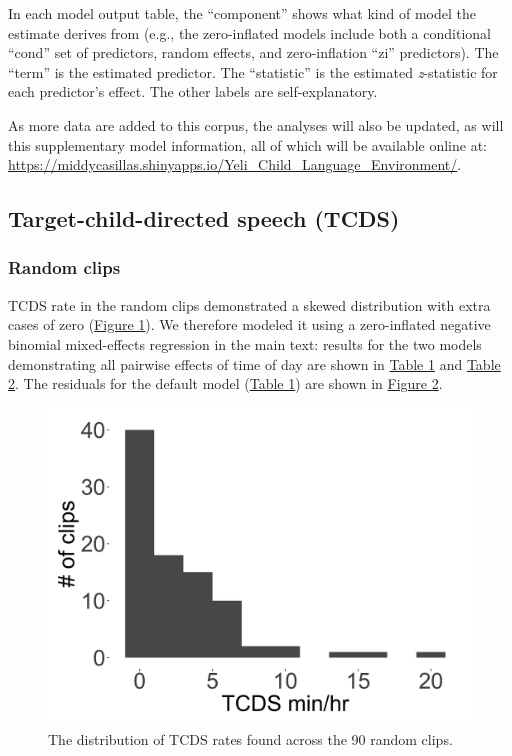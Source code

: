\documentclass[,man,floatsintext]{apa6}
\begin{document}
In each model output table, the \enquote{component} shows what kind of
model the estimate derives from (e.g., the zero-inflated models include
both a conditional \enquote{cond} set of predictors, random effects, and
zero-inflation \enquote{zi} predictors). The \enquote{term} is the
estimated predictor. The \enquote{statistic} is the estimated
\emph{z}-statistic for each predictor's effect. The other labels are
self-explanatory.

As more data are added to this corpus, the analyses will also be
updated, as will this supplementary model information, all of which will
be available online at:
\url{https://middycasillas.shinyapps.io/Yeli_Child_Language_Environment/}.

\subsection{Target-child-directed speech (TCDS)}\label{models-tcds}

\subsubsection{Random clips}\label{models-tcds-random}

TCDS rate in the random clips demonstrated a skewed distribution with
extra cases of zero (\protect\hyperlink{fig1}{Figure 1}). We therefore
modeled it using a zero-inflated negative binomial mixed-effects
regression in the main text: results for the two models demonstrating
all pairwise effects of time of day are shown in
\protect\hyperlink{tab1}{Table 1} and \protect\hyperlink{tab2}{Table 2}.
The residuals for the default model (\protect\hyperlink{tab1}{Table 1})
are shown in \protect\hyperlink{fig2}{Figure 2}.

\FloatBarrier

\begin{figure}[H]

{\centering \includegraphics[width=0.4\linewidth]{www/TCDS_random_distribution} 

}

\caption{The distribution of TCDS rates found across the 90 random clips.}\label{fig:fig1}
\end{figure}
\end{document}
